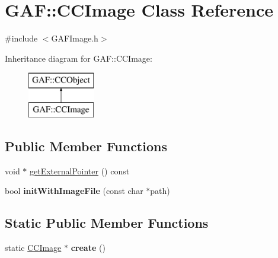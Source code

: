 \hypertarget{class_g_a_f_1_1_c_c_image}{\section{G\-A\-F\-:\-:C\-C\-Image Class Reference}
\label{class_g_a_f_1_1_c_c_image}
}


{\ttfamily \#include $<$G\-A\-F\-Image.\-h$>$}

Inheritance diagram for G\-A\-F\-:\-:C\-C\-Image\-:\begin{figure}[H]
\begin{center}
\leavevmode
\includegraphics[height=2.000000cm]{class_g_a_f_1_1_c_c_image}
\end{center}
\end{figure}
\subsection*{Public Member Functions}
\begin{DoxyCompactItemize}
\item 
void $\ast$ \hyperlink{class_g_a_f_1_1_c_c_image_ab17ab53d6808ce7ebe8c3f3c5dd60e6a}{get\-External\-Pointer} () const 
\item 
\hypertarget{class_g_a_f_1_1_c_c_image_a7559bbec034c045ce0093c9d2bdc668e}{bool {\bfseries init\-With\-Image\-File} (const char $\ast$path)}\label{class_g_a_f_1_1_c_c_image_a7559bbec034c045ce0093c9d2bdc668e}

\end{DoxyCompactItemize}
\subsection*{Static Public Member Functions}
\begin{DoxyCompactItemize}
\item 
\hypertarget{class_g_a_f_1_1_c_c_image_a1ce843bd6d475a5cfb46db4218bbf515}{static \hyperlink{class_g_a_f_1_1_c_c_image}{C\-C\-Image} $\ast$ {\bfseries create} ()}\label{class_g_a_f_1_1_c_c_image_a1ce843bd6d475a5cfb46db4218bbf515}

\end{DoxyCompactItemize}


